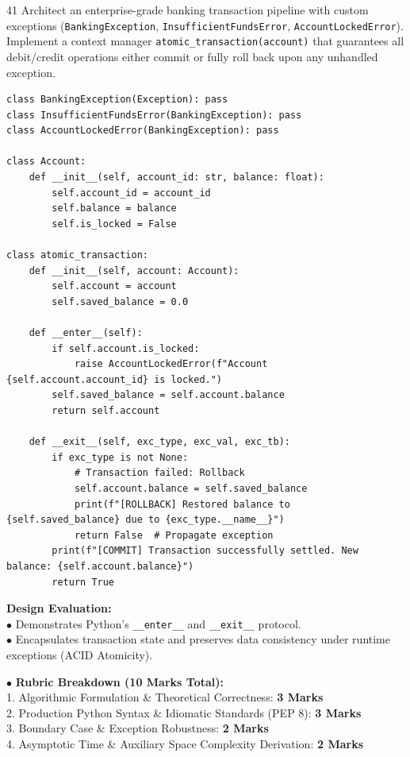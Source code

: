 \begin{subjectiveq}{4}{1}
Architect an enterprise-grade banking transaction pipeline with custom exceptions (\texttt{BankingException}, \texttt{InsufficientFundsError}, \texttt{AccountLockedError}). Implement a context manager \texttt{atomic\_transaction(account)} that guarantees all debit/credit operations either commit or fully roll back upon any unhandled exception.
\end{subjectiveq}

\begin{solbox}
\begin{lstlisting}
class BankingException(Exception): pass
class InsufficientFundsError(BankingException): pass
class AccountLockedError(BankingException): pass

class Account:
    def __init__(self, account_id: str, balance: float):
        self.account_id = account_id
        self.balance = balance
        self.is_locked = False

class atomic_transaction:
    def __init__(self, account: Account):
        self.account = account
        self.saved_balance = 0.0

    def __enter__(self):
        if self.account.is_locked:
            raise AccountLockedError(f"Account {self.account.account_id} is locked.")
        self.saved_balance = self.account.balance
        return self.account

    def __exit__(self, exc_type, exc_val, exc_tb):
        if exc_type is not None:
            # Transaction failed: Rollback
            self.account.balance = self.saved_balance
            print(f"[ROLLBACK] Restored balance to {self.saved_balance} due to {exc_type.__name__}")
            return False  # Propagate exception
        print(f"[COMMIT] Transaction successfully settled. New balance: {self.account.balance}")
        return True
\end{lstlisting}
\textbf{Design Evaluation:}\\
$\bullet$ Demonstrates Python's \texttt{\_\_enter\_\_} and \texttt{\_\_exit\_\_} protocol.\\
$\bullet$ Encapsulates transaction state and preserves data consistency under runtime exceptions (ACID Atomicity).
\end{solbox}

\begin{examinertip}
$\bullet$ \textbf{Rubric Breakdown (10 Marks Total):}\\
1. Algorithmic Formulation \& Theoretical Correctness: \textbf{3 Marks}\\
2. Production Python Syntax \& Idiomatic Standards (PEP 8): \textbf{3 Marks}\\
3. Boundary Case \& Exception Robustness: \textbf{2 Marks}\\
4. Asymptotic Time \& Auxiliary Space Complexity Derivation: \textbf{2 Marks}
\end{examinertip}
